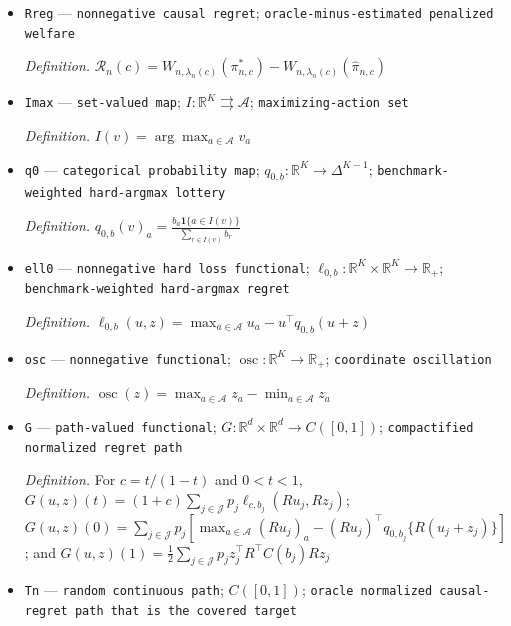 \documentclass{article}
\begin{document}
\begin{itemize}
  \par\smallskip\noindent\emph{Definition.} \(\widehat\pi_{n,c,j}=q_{c,b_j}(R\widehat u_{n,j})\)
  \item \texttt{Rreg} --- \texttt{nonnegative causal regret}; \texttt{oracle-\allowbreak{}minus-\allowbreak{}estimated penalized welfare}
  \par\smallskip\noindent\emph{Definition.} \(\mathscr R_n(c)=W_{n,\lambda_n(c)}(\pi^*_{n,c})-W_{n,\lambda_n(c)}(\widehat\pi_{n,c})\)
  \item \texttt{Imax} --- \texttt{set-\allowbreak{}valued map}; \(I:\mathbb R^K\rightrightarrows\mathcal A\); \texttt{maximizing-\allowbreak{}action set}
  \par\smallskip\noindent\emph{Definition.} \(I(v)=\arg\max_{a\in\mathcal A}v_a\)
  \item \texttt{q0} --- \texttt{categorical probability map}; \(q_{0,b}:\mathbb R^K\to\Delta^{K-1}\); \texttt{benchmark-\allowbreak{}weighted hard-\allowbreak{}argmax lottery}
  \par\smallskip\noindent\emph{Definition.} \(q_{0,b}(v)_a=\frac{b_a\mathbf 1\{a\in I(v)\}}{\sum_{r\in I(v)}b_r}\)
  \item \texttt{ell0} --- \texttt{nonnegative hard loss functional}; \(\ell_{0,b}:\mathbb R^K\times\mathbb R^K\to\mathbb R_+\); \texttt{benchmark-\allowbreak{}weighted hard-\allowbreak{}argmax regret}
  \par\smallskip\noindent\emph{Definition.} \(\ell_{0,b}(u,z)=\max_{a\in\mathcal A}u_a-u^{\top}q_{0,b}(u+z)\)
  \item \texttt{osc} --- \texttt{nonnegative functional}; \(\operatorname{osc}:\mathbb R^K\to\mathbb R_+\); \texttt{coordinate oscillation}
  \par\smallskip\noindent\emph{Definition.} \(\operatorname{osc}(z)=\max_{a\in\mathcal A}z_a-\min_{a\in\mathcal A}z_a\)
  \item \texttt{G} --- \texttt{path-\allowbreak{}valued functional}; \(G:\mathbb R^d\times\mathbb R^d\to C([0,1])\); \texttt{compactified normalized regret path}
  \par\smallskip\noindent\emph{Definition.} For \(c=t/(1-t)\) and \(0<t<1\), \(G(u,z)(t)=(1+c)\sum_{j\in\mathcal J}p_j\ell_{c,b_j}(Ru_j,Rz_j)\); \(G(u,z)(0)=\sum_{j\in\mathcal J}p_j[\max_{a\in\mathcal A}(Ru_j)_a-(Ru_j)^{\top}q_{0,b_j}\{R(u_j+z_j)\}]\); and \(G(u,z)(1)=\frac12\sum_{j\in\mathcal J}p_jz_j^{\top}R^{\top}C(b_j)Rz_j\)
  \item \texttt{Tn} --- \texttt{random continuous path}; \(C([0,1])\); \texttt{oracle normalized causal-\allowbreak{}regret path that is the covered target}

\end{itemize}
\end{document}
